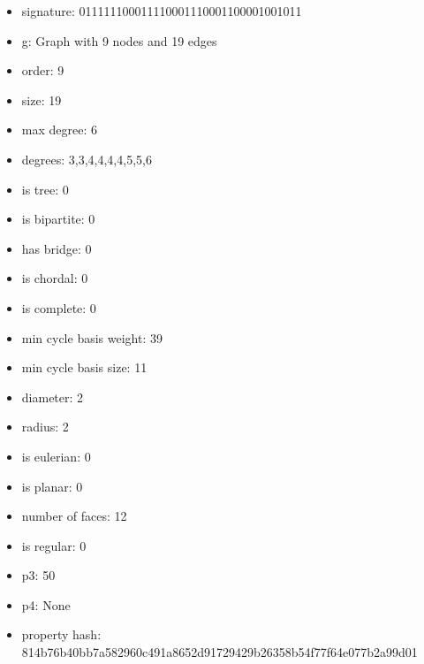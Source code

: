 \newpage
\begin{figure}
\end{figure}
\begin{itemize}
\item signature: 011111100011110001110001100001001011
\item g: Graph with 9 nodes and 19 edges
\item order: 9
\item size: 19
\item max degree: 6
\item degrees: 3,3,4,4,4,4,5,5,6
\item is tree: 0
\item is bipartite: 0
\item has bridge: 0
\item is chordal: 0
\item is complete: 0
\item min cycle basis weight: 39
\item min cycle basis size: 11
\item diameter: 2
\item radius: 2
\item is eulerian: 0
\item is planar: 0
\item number of faces: 12
\item is regular: 0
\item p3: 50
\item p4: None
\item property hash: 814b76b40bb7a582960c491a8652d91729429b26358b54f77f64e077b2a99d01
\end{itemize}
